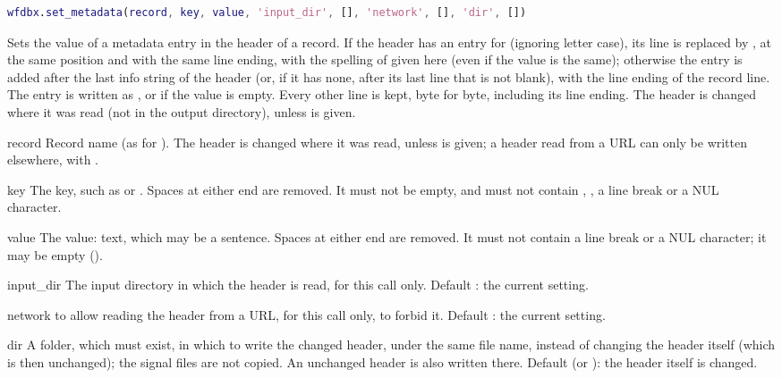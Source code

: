 \begin{lstlisting}[language=Matlab,style=signature]
wfdbx.set_metadata(record, key, value, 'input_dir', [], 'network', [], 'dir', [])
\end{lstlisting}
Sets the value of a metadata entry in the header of a record. If the header has an entry
for  (ignoring letter case), its line is replaced by , at
the same position and with the same line ending, with the spelling of  given
here (even if the value is the same); otherwise the entry is added after the last info
string of the header (or, if it has none, after its last line that is not blank), with
the line ending of the record line. The entry is written as , or
 if the value is empty. Every other line is kept, byte for byte, including
its line ending. The header is changed where it was read (not in the output directory),
unless  is given.
\begin{params}
\item[record] Record name (as for ). The header is changed
  where it was read, unless  is given; a header read from a URL can only be
  written elsewhere, with .
\item[key] The key, such as  or . Spaces at either end
  are removed. It must not be empty, and must not contain \code{:}, \code{\#}, a line
  break or a NUL character.
\item[value] The value: text, which may be a sentence. Spaces at either end are removed.
  It must not contain a line break or a NUL character; it may be empty ().
\item[input\_dir] The input directory in which the header is read, for this call only.
  Default \code{[]}: the current setting.
\item[network]  to allow reading the header from a URL, for this call only,
   to forbid it. Default \code{[]}: the current setting.
\item[dir] A folder, which must exist, in which to write the changed header, under the
  same file name, instead of changing the header itself (which is then unchanged); the
  signal files are not copied. An unchanged header is also written there. Default
  \code{[]} (or ): the header itself is changed.
\end{params}
